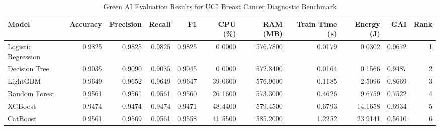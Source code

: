 \begin{table}[htbp]
\caption{Green AI Evaluation Results for UCI Breast Cancer Diagnostic Benchmark}
\label{tab:breast_cancer_results}
\begin{tabular}{lrrrrrrrrrr}
\toprule
Model & Accuracy & Precision & Recall & F1 & CPU (\%) & RAM (MB) & Train Time (s) & Energy (J) & GAI & Rank \\
\midrule
Logistic Regression & 0.9825 & 0.9825 & 0.9825 & 0.9825 & 0.0000 & 576.7800 & 0.0179 & 0.0302 & 0.9672 & 1 \\
Decision Tree & 0.9035 & 0.9090 & 0.9035 & 0.9045 & 0.0000 & 572.8400 & 0.0164 & 0.1566 & 0.9487 & 2 \\
LightGBM & 0.9649 & 0.9652 & 0.9649 & 0.9647 & 39.0600 & 576.9600 & 0.1185 & 2.5096 & 0.8669 & 3 \\
Random Forest & 0.9561 & 0.9561 & 0.9561 & 0.9560 & 26.1600 & 573.3000 & 0.4626 & 9.6759 & 0.7522 & 4 \\
XGBoost & 0.9474 & 0.9474 & 0.9474 & 0.9471 & 48.4400 & 579.4500 & 0.6793 & 14.1658 & 0.6934 & 5 \\
CatBoost & 0.9561 & 0.9569 & 0.9561 & 0.9558 & 41.5500 & 585.2000 & 1.2252 & 23.9141 & 0.5610 & 6 \\
\bottomrule
\end{tabular}
\end{table}
